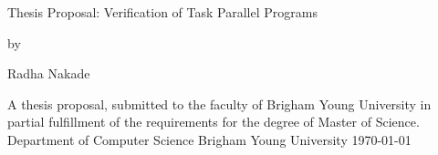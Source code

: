\pagestyle{empty}


\begin{center}
\begin{Huge}
Thesis Proposal:
\linebreak
Verification of Task Parallel Programs
\linebreak
\end{Huge}

by \linebreak \linebreak \linebreak \linebreak

\begin{huge}
Radha Nakade
\linebreak 
\linebreak 
\linebreak 
\linebreak 
\end{huge}

\begin{large}

A thesis proposal, submitted to the faculty of Brigham Young University in
partial fulfillment of the requirements for the degree of Master of Science.
\linebreak 
\linebreak 
\linebreak 
\linebreak 
Department of
Computer Science 
\linebreak 
\linebreak 
Brigham Young University
\linebreak 
\linebreak 
\today
\linebreak 
\linebreak

\end{large}


\end{center}
\pagebreak
